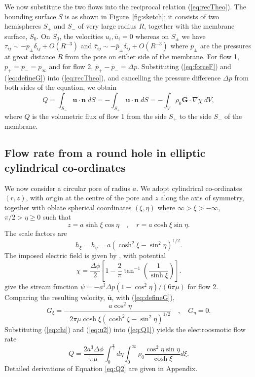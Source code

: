 We now substitute the two flows into the reciprocal relation (\ref{eq:recTheo}). The bounding surface $S$ is as shown in Figure~\ref{fig:sketch}; it consists of two hemispheres $S_{+}$ and $S_{-}$ of very large radius $R$, together with the membrane surface, $S_{0}$.
On $S_{0}$, the velocities $u_{i}, \bar{u}_{i}=0$ whereas on 
$S_{\pm}$ we have $\tau_{ij} \sim - p_{\pm} \delta_{ij} + O(R^{-3})$ and 
$\bar{\tau}_{ij} \sim - \bar{p}_{\pm} \delta_{ij} + O(R^{-3})$ where $p_{\pm}$ are the pressures 
at great distance $R$ from the pore on either side of the membrane. 
For flow 1, $p_{+}=p_{-} = p_{\infty}$ and for flow 2, $\bar{p}_{+} - \bar{p}_{-} = \Delta p$. Substituting
(\ref{eq:forceF}) and (\ref{eq:defineG}) into (\ref{eq:recTheo}), and cancelling the pressure difference $\Delta p$ from both sides of the equation, we obtain
\begin{equation}
Q = \int_{S_-}\mathbf{u}\cdot\mathbf{n}\; dS=
 - \int_{S_+}\mathbf{u}\cdot\mathbf{n}\; dS =
- \int_V \rho_0 \mathbf{G} \cdot \nabla \chi \; dV,
\label{eq:Q1}
\end{equation}
where $Q$ is the volumetric flux of flow 1 from the side $S_{+}$ to the side $S_{-}$ of the 
membrane.


\subsection{Flow rate from a round hole in elliptic cylindrical co-ordinates}\label{subsec:roundhole}
We now consider a circular pore of radius $a$. We adopt cylindrical co-ordinates  $(r,z)$, with origin at the centre of the pore and $z$ along the axis of symmetry, together with oblate spherical coordinates $(\xi,\eta)$ where $\infty > \xi > - \infty$, $\pi/2 > \eta \geq 0$ such that
\begin{equation}
z=a\sinh\xi\cos\eta\quad,\quad r=a\cosh\xi\sin\eta.
\end{equation}
The scale factors are
\begin{equation}
h_\xi=h_\eta=a(\cosh^2\xi-\sin^2\eta)^{1/2}.
\end{equation}
The imposed electric field is given by  \cite[p. 1292]{M&F}, with potential
\begin{equation}
\chi = \frac{\Delta \phi}{2} \left[ 1- \frac{2}{\pi}
\tan^{-1}\left( \frac{1}{\sinh \xi} \right) \right].
\label{eq:chi}
\end{equation}
\cite[p. 153]{Happel&Brenner}
give the stream function $\psi=-a^3\Delta p(1-\cos^2\eta)/(6\pi\mu)$ for
flow 2. Comparing the resulting velocity, $\bar{\mathbf{u}}$, with
(\ref{eq:defineG}),
\begin{equation}
G_\xi =  - \frac{a \cos^2\eta}{2\pi\mu
\cosh\xi(\cosh^2\xi-\sin^2\eta)^{1/2}}\quad,\quad
G_\eta  =  0.
\label{eq:u2}
\end{equation}
Substituting (\ref{eq:chi}) and (\ref{eq:u2}) into (\ref{eq:Q1}) yields the electroosmotic flow rate
\begin{equation}
Q   =  \frac{2a^3\Delta\phi}{\pi\mu}
\int_0^{\frac{\pi}{2}} d\eta \int_0^\infty \rho_0
\frac{\cos^2\eta\sin\eta}{\cosh\xi} d\xi.
\label{eq:Q2}
\end{equation}
Detailed derivations of Equation \ref{eq:Q2} are given in Appendix.

